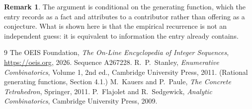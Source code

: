 \documentclass[11pt,a4paper]{article}
\theoremstyle{plain}
\theoremstyle{definition}
\newtheorem{remark}[theorem]{Remark}
\begin{document}
\begin{remark}
The argument is conditional on the generating function, which the entry records as a fact and
attributes to a contributor rather than offering as a conjecture. What is shown here is that
the empirical recurrence is not an independent guess: it is equivalent to information the
entry already contains.
\end{remark}

\begin{thebibliography}{9}
 The OEIS Foundation, \emph{The On-Line Encyclopedia of Integer
Sequences}, \url{https://oeis.org}, 2026. Sequence A267228.
 R.~P.~Stanley, \emph{Enumerative Combinatorics}, Volume 1, 2nd ed.,
Cambridge University Press, 2011. (Rational generating functions, Section 4.1.)
 M.~Kauers and P.~Paule, \emph{The Concrete Tetrahedron}, Springer, 2011.
 P.~Flajolet and R.~Sedgewick, \emph{Analytic Combinatorics}, Cambridge
University Press, 2009.
\end{thebibliography}
\end{document}
